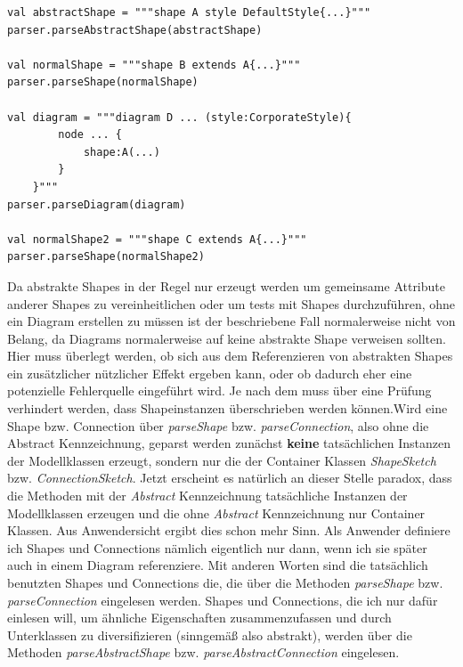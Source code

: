 \begin{lstlisting}[style = scala, caption = {Beispiel Aufrufe zum Provozieren einer möglicherweise ungewollten Situation durch Vererbung}, label = {lst:beispielabstractshape}]
val abstractShape = """shape A style DefaultStyle{...}"""
parser.parseAbstractShape(abstractShape)

val normalShape = """shape B extends A{...}"""
parser.parseShape(normalShape)

val diagram = """diagram D ... (style:CorporateStyle){
		node ... {
			shape:A(...)
		}
	}"""
parser.parseDiagram(diagram)

val normalShape2 = """shape C extends A{...}"""
parser.parseShape(normalShape2)
\end{lstlisting} Da abstrakte Shapes in der Regel nur erzeugt werden um gemeinsame Attribute anderer Shapes zu vereinheitlichen oder um tests mit Shapes durchzuführen, ohne ein Diagram erstellen zu müssen ist der beschriebene Fall normalerweise nicht von Belang, da Diagrams normalerweise auf keine abstrakte Shape verweisen sollten. Hier muss überlegt werden, ob sich aus dem Referenzieren von abstrakten Shapes ein zusätzlicher nützlicher Effekt ergeben kann, oder ob dadurch eher eine potenzielle Fehlerquelle eingeführt wird. Je nach dem muss über eine Prüfung verhindert werden, dass Shapeinstanzen überschrieben werden können.\linebreak Wird eine Shape bzw. Connection über \textit{parseShape} bzw. \textit{parseConnection}, also ohne die Abstract Kennzeichnung, geparst werden zunächst \textbf{keine} tatsächlichen Instanzen der Modellklassen erzeugt, sondern nur die der Container Klassen \textit{ShapeSketch} bzw. \textit{ConnectionSketch}. Jetzt erscheint es natürlich an dieser Stelle paradox, dass die Methoden mit der \textit{Abstract} Kennzeichnung tatsächliche Instanzen der Modellklassen erzeugen und die ohne \textit{Abstract} Kennzeichnung nur Container Klassen. Aus Anwendersicht ergibt dies schon mehr Sinn. Als Anwender definiere ich Shapes und Connections nämlich eigentlich nur dann, wenn ich sie später auch in einem Diagram referenziere. Mit anderen Worten sind die tatsächlich benutzten Shapes und Connections die, die über die Methoden \textit{parseShape} bzw. \textit{parseConnection} eingelesen werden. Shapes und Connections, die ich nur dafür einlesen will, um ähnliche Eigenschaften zusammenzufassen und durch Unterklassen zu diversifizieren (sinngemäß also abstrakt), werden über die Methoden \textit{parseAbstractShape} bzw. \textit{parseAbstractConnection} eingelesen.
